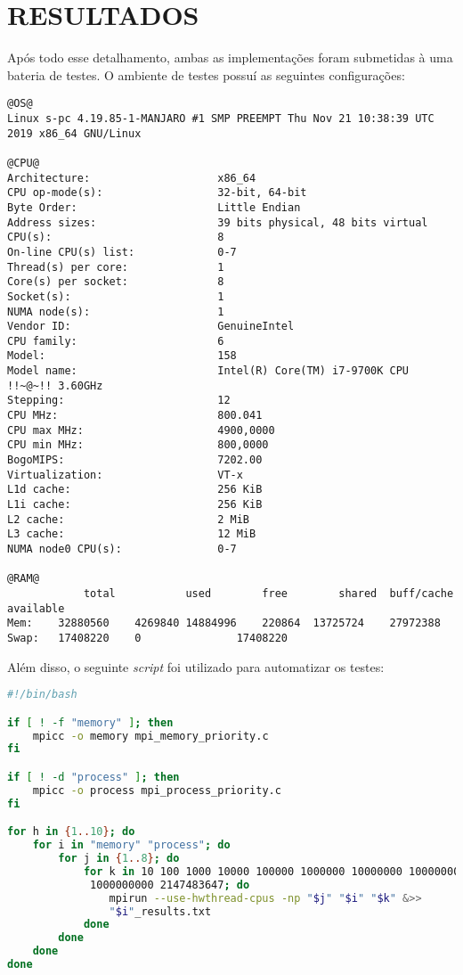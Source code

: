 \section{\normalsize RESULTADOS}
	Após todo esse detalhamento, ambas as implementações foram submetidas à uma bateria de testes. O ambiente de testes possuí as seguintes configurações:
	
\begin{lstlisting}[frame=single,style=base]
@OS@
Linux s-pc 4.19.85-1-MANJARO #1 SMP PREEMPT Thu Nov 21 10:38:39 UTC 2019 x86_64 GNU/Linux

@CPU@
Architecture:                    x86_64
CPU op-mode(s):                  32-bit, 64-bit
Byte Order:                      Little Endian
Address sizes:                   39 bits physical, 48 bits virtual
CPU(s):                          8
On-line CPU(s) list:             0-7
Thread(s) per core:              1
Core(s) per socket:              8
Socket(s):                       1
NUMA node(s):                    1
Vendor ID:                       GenuineIntel
CPU family:                      6
Model:                           158
Model name:                      Intel(R) Core(TM) i7-9700K CPU !!~@~!! 3.60GHz
Stepping:                        12
CPU MHz:                         800.041
CPU max MHz:                     4900,0000
CPU min MHz:                     800,0000
BogoMIPS:                        7202.00
Virtualization:                  VT-x
L1d cache:                       256 KiB
L1i cache:                       256 KiB
L2 cache:                        2 MiB
L3 cache:                        12 MiB
NUMA node0 CPU(s):               0-7

@RAM@
			total			used		free		shared	buff/cache	available
Mem:	32880560	4269840	14884996	220864	13725724	27972388
Swap:	17408220	0				17408220
\end{lstlisting}

	Além disso, o seguinte \textit{script} foi utilizado para automatizar os testes:

\begin{lstlisting}[language=bash,tabsize=2]
#!/bin/bash

if [ ! -f "memory" ]; then
	mpicc -o memory mpi_memory_priority.c
fi

if [ ! -d "process" ]; then
	mpicc -o process mpi_process_priority.c
fi

for h in {1..10}; do
	for i in "memory" "process"; do
		for j in {1..8}; do
			for k in 10 100 1000 10000 100000 1000000 10000000 100000000
			 1000000000 2147483647; do
				mpirun --use-hwthread-cpus -np "$j" "$i" "$k" &>> 
				"$i"_results.txt 
			done
		done
	done
done
\end{lstlisting}

